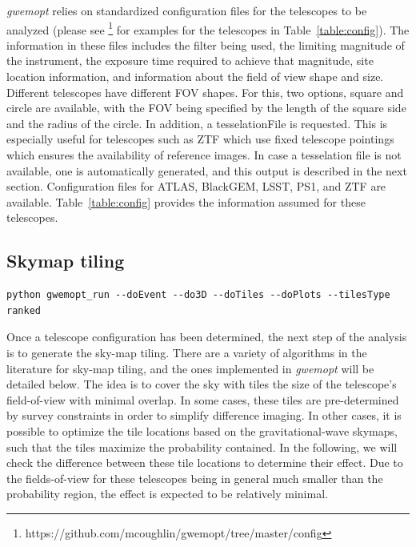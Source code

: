 \documentclass[twocolumn]{aastex62}
\begin{document}
\emph{gwemopt} relies on standardized configuration files for the telescopes to be analyzed (please see \footnote{https://github.com/mcoughlin/gwemopt/tree/master/config} for examples for the telescopes in Table~\ref{table:config}). 
The information in these files includes the filter being used, the limiting magnitude of the instrument, the exposure time required to achieve that magnitude, site location information, and information about the field of view shape and size. 
Different telescopes have different FOV shapes.
For this, two options, square and circle are available, with the FOV being specified by the length of the square side and the radius of the circle. In addition, a tesselationFile is requested. This is especially useful for telescopes such as ZTF which use fixed telescope pointings which ensures the availability of reference images. In case a tesselation file is not available, one is automatically generated, and this output is described in the next section.
Configuration files for ATLAS, BlackGEM, LSST, PS1, and ZTF are available.
Table~\ref{table:config} provides the information assumed for these telescopes.\\

\subsection{Skymap tiling}
\label{subsection:tiling}
\begin{lstlisting}
python gwemopt_run --doEvent --do3D --doTiles --doPlots --tilesType ranked
\end{lstlisting}
Once a telescope configuration has been determined, the next step of the analysis is to generate the sky-map tiling.
There are a variety of algorithms in the literature for sky-map tiling, and the ones implemented in \emph{gwemopt} will be detailed below. The idea is to cover the sky with tiles the size of the telescope's field-of-view with minimal overlap. In some cases, these tiles are pre-determined by survey constraints in order to simplify difference imaging. In other cases, it is possible to optimize the tile locations based on the gravitational-wave skymaps, such that the tiles maximize the probability contained. In the following, we will check the difference between these tile locations to determine their effect. Due to the fields-of-view for these telescopes being in general much smaller than the probability region, the effect is expected to be relatively minimal.
\end{document}
